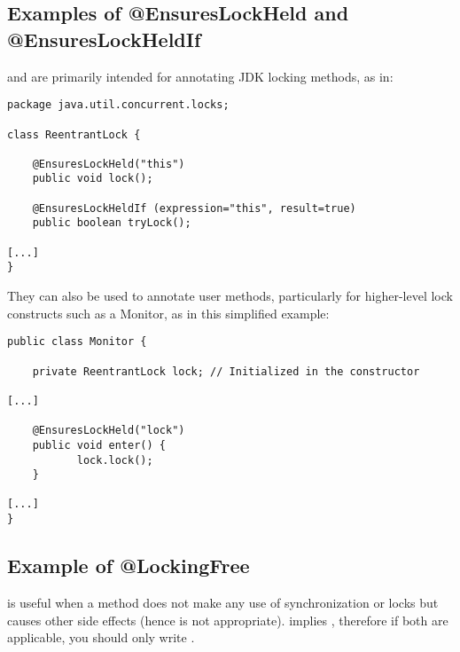\subsection{Examples of @EnsuresLockHeld and @EnsuresLockHeldIf\label{ensureslockheld-examples}}

 and  are primarily intended
for annotating JDK locking methods, as in:

\begin{Verbatim}
package java.util.concurrent.locks;
 
class ReentrantLock {
 
    @EnsuresLockHeld("this")
    public void lock();
 
    @EnsuresLockHeldIf (expression="this", result=true)
    public boolean tryLock();
 
[...]
}
\end{Verbatim}

They can also be used to annotate user methods, particularly for
higher-level lock constructs such as a Monitor, as in this simplified example:

\begin{Verbatim}
public class Monitor {
 
    private ReentrantLock lock; // Initialized in the constructor
 
[...]
 
    @EnsuresLockHeld("lock")
    public void enter() {
           lock.lock();
    }
 
[...]
}
\end{Verbatim}

\subsection{Example of @LockingFree\label{lockingfree-example}}

 is useful when a method does not make any use of synchronization
or locks but causes other side effects (hence  is not appropriate).
 implies , therefore if both are applicable,
you should only write .


